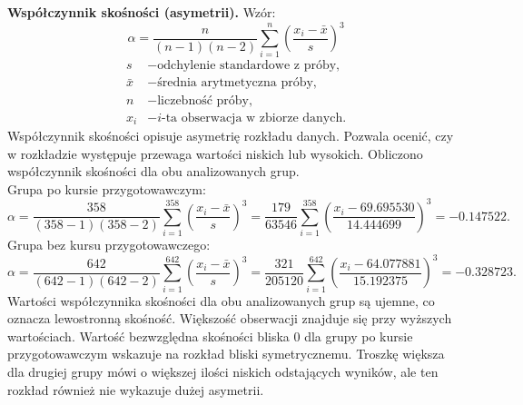 \documentclass[12pt, a4paper]{article}
\begin{document}
	\textbf{Współczynnik skośności (asymetrii).} Wzór:
	\[
	\alpha =\frac{n}{(n-1)(n-2)}\sum_{i=1}^{n} \left(\frac{x_i-\bar{x}}{s}\right)^3
	\]
	\[
	\begin{aligned}
		s &- \text{odchylenie standardowe z próby,} \\
		\bar{x} &- \text{średnia arytmetyczna próby,}\\
		n &- \text{liczebność próby,} \\
		x_i &- \text{$i$-ta obserwacja w zbiorze danych.} 
	\end{aligned}
	\]
	Współczynnik skośności opisuje asymetrię rozkładu danych. Pozwala ocenić, czy w rozkładzie występuje przewaga wartości niskich lub wysokich.
	Obliczono współczynnik skośności dla obu analizowanych grup.\\
	Grupa po kursie przygotowawczym:\\
	\[
	\alpha =\frac{358}{(358-1)(358-2)}\sum_{i=1}^{358} \left(\frac{x_i-\bar{x}}{s}\right)^3=\frac{179}{63546}\sum_{i=1}^{358} \left(\frac{x_i-69.695530}{14.444699}\right)^3=-0.147522.
	\]
	Grupa bez kursu przygotowawczego:\\
		\[
	\alpha =\frac{642}{(642-1)(642-2)}\sum_{i=1}^{642} \left(\frac{x_i-\bar{x}}{s}\right)^3=
	\frac{321}{205120}\sum_{i=1}^{642} \left(\frac{x_i-64.077881}{15.192375}\right)^3=-0.328723.
	\]
	Wartości współczynnika skośności dla obu analizowanych grup są ujemne, co oznacza lewostronną skośność. Większość obserwacji znajduje się przy wyższych wartościach. Wartość bezwzględna skośności bliska $0$ dla grupy po kursie przygotowawczym wskazuje na rozkład bliski symetrycznemu. Troszkę większa dla drugiej grupy mówi o większej ilości niskich odstających wyników, ale ten rozkład również nie wykazuje dużej asymetrii. \\
	
\end{document}
